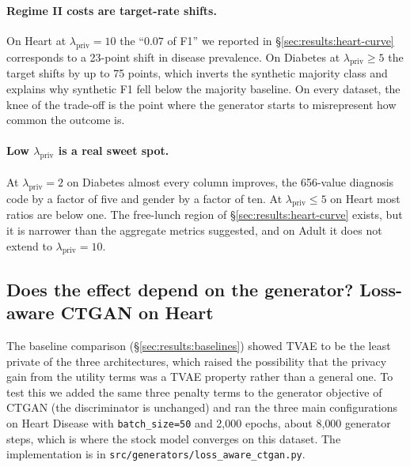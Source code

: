 \documentclass[11pt,a4paper]{article}
\newcommand{\lpriv}{\lambda_{\text{priv}}}
\begin{document}
\paragraph{Regime II costs are target-rate shifts.}
On Heart at $\lpriv = 10$ the ``$0.07$ of F1'' we reported in
\S\ref{sec:results:heart-curve} corresponds to a 23-point shift in disease
prevalence. On Diabetes at $\lpriv \ge 5$ the target shifts by up to 75
points, which inverts the synthetic majority class and explains why synthetic
F1 fell below the majority baseline. On every dataset, the knee of the
trade-off is the point where the generator starts to misrepresent how common
the outcome is.

\paragraph{Low $\lpriv$ is a real sweet spot.}
At $\lpriv = 2$ on Diabetes almost every column improves, the 656-value
diagnosis code by a factor of five and gender by a factor of ten. At
$\lpriv \le 5$ on Heart most ratios are below one. The free-lunch region of
\S\ref{sec:results:heart-curve} exists, but it is narrower than the aggregate
metrics suggested, and on Adult it does not extend to $\lpriv = 10$.

\subsection{Does the effect depend on the generator? Loss-aware CTGAN on Heart}
\label{sec:results:ctgan}

The baseline comparison (\S\ref{sec:results:baselines}) showed TVAE to be the
least private of the three architectures, which raised the possibility that
the privacy gain from the utility terms was a TVAE property rather than a
general one. To test this we added the same three penalty terms to the
generator objective of CTGAN (the discriminator is unchanged) and ran the
three main configurations on Heart Disease with \texttt{batch\_size=50} and
2{,}000 epochs, about 8{,}000 generator steps, which is where the stock model
converges on this dataset. The implementation is in
\texttt{src/generators/loss\_aware\_ctgan.py}.
\end{document}
